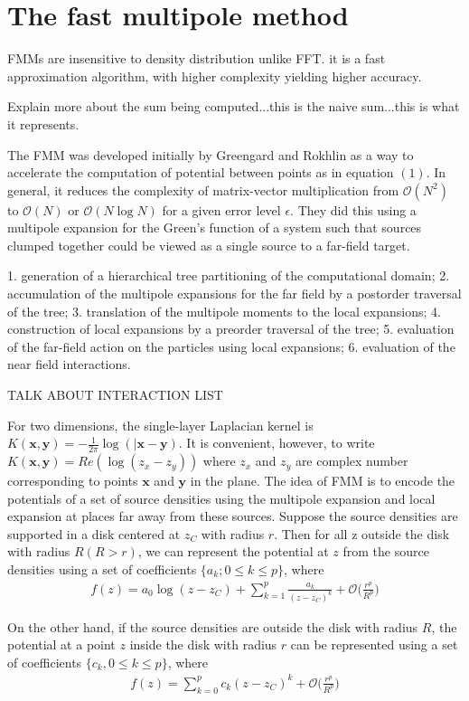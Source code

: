 \documentclass[11pt, oneside]{article}   	%
\begin{document}
\section{The fast multipole method}
FMMs are insensitive to density distribution unlike FFT. it is a fast approximation algorithm, with higher complexity yielding higher accuracy.

Explain more about the sum being computed...this is the naive sum...this is what it represents.

The FMM was developed initially by Greengard and Rokhlin as a way to accelerate the computation of potential between points as in equation $(1)$. In general, it reduces the complexity of matrix-vector multiplication from $\mathcal{O}(N^2)$ to $\mathcal{O}(N)$ or $\mathcal{O}(N\log N)$ for a given error level $\epsilon$. They did this using a multipole expansion for the Green's function of a system such that sources clumped together could be viewed as a single source to a far-field target.

1. generation of a hierarchical tree partitioning of the computational domain;
2. accumulation of the multipole expansions for the far field by a postorder traversal of the tree;
3. translation of the multipole moments to the local expansions;
4. construction of local expansions by a preorder traversal of the tree;
5. evaluation of the far-field action on the particles using local expansions;
6. evaluation of the near field interactions.

TALK ABOUT INTERACTION LIST

For two dimensions, the single-layer Laplacian kernel is $K(\mathbf{x},\mathbf{y})=-\frac{1}{2\pi}\log(|\mathbf{x}-\mathbf{y})$. It is convenient, however, to write $K(\mathbf{x},\mathbf{y})=Re(\log(z_x-z_y))$ where $z_x$ and $z_y$ are complex number corresponding to points $\mathbf{x}$ and $\mathbf{y}$ in the plane. The idea of FMM is to encode the potentials of a set of source densities using the multipole expansion and local expansion at places far away from these sources. Suppose the source densities are supported in a disk centered at $z_C$ with radius $r$. Then for all z outside the disk with radius $R (R > r)$, we can represent the potential at $z$ from the source densities using a set of coefficients $\{a_k ; 0 \le k \le p\}$, where
\begin{align}
f(z)=a_0\log(z-z_C)+\sum_{k=1}^p\frac{a_k}{(z-z_C)^k}+\mathcal{O}\bigg(\frac{r^p}{R^p}\bigg)
\end{align}

On the other hand, if the source densities are outside the disk with radius $R$, the potential at a point $z$ inside the disk with radius $r$ can be represented using a set of coefficients $\{c_k, 0\le k\le p\}$, where
\begin{align}
f(z)=\sum_{k=0}^pc_k(z-z_C)^k+\mathcal{O}\bigg(\frac{r^p}{R^p}\bigg)
\end{align}
\end{document}
